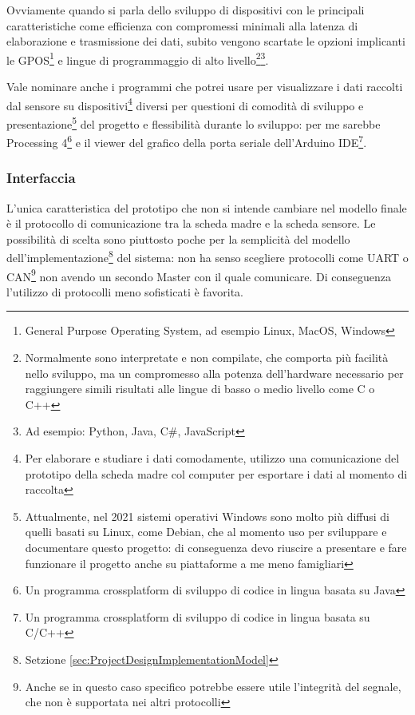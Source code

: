 \documentclass[a4paper, 10pt, final]{article} %
\begin{document}
    Ovviamente quando si parla dello sviluppo di dispositivi con le principali caratteristiche come efficienza con compromessi minimali alla latenza di elaborazione e trasmissione dei dati, subito vengono scartate le opzioni implicanti le GPOS\footnote{General Purpose Operating System, ad esempio Linux, MacOS, Windows} e lingue di programmaggio di alto livello\footnote{Normalmente sono interpretate e non compilate, che comporta pi\`{u} facilit\`{a} nello sviluppo, ma un compromesso alla potenza dell'hardware necessario per raggiungere simili risultati alle lingue di basso o medio livello come C o C++}\:\footnote{Ad esempio: Python, Java, C\#, JavaScript}.
    
    
    Vale nominare anche i programmi che potrei usare per visualizzare i dati raccolti dal sensore su dispositivi\footnote{Per elaborare e studiare i dati comodamente, utilizzo una comunicazione del prototipo della scheda madre col computer per esportare i dati al momento di raccolta} diversi per questioni di comodit\`{a} di sviluppo e presentazione\footnote{Attualmente, nel 2021 sistemi operativi Windows sono molto pi\`{u} diffusi di quelli basati su Linux, come Debian, che al momento uso per sviluppare e documentare questo progetto: di conseguenza devo riuscire a presentare e fare funzionare il progetto anche su piattaforme a me meno famigliari} del progetto e flessibilit\`{a} durante lo sviluppo: per me sarebbe Processing 4\footnote{Un programma crossplatform di sviluppo di codice in lingua basata su Java} e il viewer del grafico della porta seriale dell'Arduino IDE\footnote{Un programma crossplatform di sviluppo di codice in lingua basata su C/C++}.

    \subsubsection{Interfaccia}\label{sec:MotherboardDesignInterface}
    L'unica caratteristica del prototipo che non si intende cambiare nel modello finale \`{e} il protocollo di comunicazione tra la scheda madre e la scheda sensore.
    Le possibilit\`{a} di scelta sono piuttosto poche per la semplicit\`{a} del modello dell'implementazione\footnote{Setzione \ref{sec:ProjectDesignImplementationModel}} del sistema: non ha senso scegliere protocolli come UART o CAN\footnote{Anche se in questo caso specifico potrebbe essere utile l'integrit\`{a} del segnale, che non \`{e} supportata nei altri protocolli} non avendo un secondo Master con il quale comunicare.
    Di conseguenza l'utilizzo di protocolli meno sofisticati \`{e} favorita.
\end{document}
